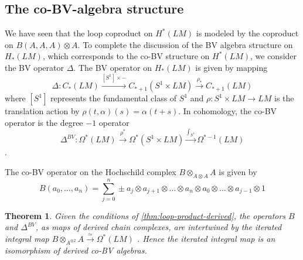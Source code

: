 \documentclass{scrartcl}
\theoremstyle{plain}
\newtheorem{theorem}{Theorem}[section]
\newtheorem{proposition}[theorem]{Proposition}
\theoremstyle{definition}
\newcommand{\quiso}{\simeq}
\let\xto\xrightarrow
\let\xfrom\xleftarrow
\newcommand{\blank}{-}
\begin{document}


\subsection{The co-BV-algebra structure} \label{subsec:co-bv-alg}
We have seen that the loop coproduct on $H^*(LM)$ is modeled by the coproduct on $B(A, A, A)\otimes A$. To complete the discussion of the BV algebra structure on $H_*(LM)$, which corresponds to the co-BV structure on $H^*(LM)$, we consider the BV operator $\Delta$. The BV operator on $H_*(LM)$ is given by mapping $$\Delta\colon C_*(LM)\xto{[S^1]\times\blank} C_{*+1}(S^1\times LM)\xto{\rho_*} C_{*+1}(LM)$$
where $[S^1]$ represents the fundamental class of $S^1$ and $\rho\colon S^1\times LM\to LM$ is the translation action by $\rho(t, \alpha)(s) = \alpha(t+s)$. In cohomology, the co-BV operator is the degree $-1$ operator $$\Delta^{BV}\colon \Omega^*(LM) \xto{\rho^*} \Omega^*(S^1\times LM) \xto{\int_{S^1}} \Omega^{*-1}(LM)$$.

The co-BV operator on the Hochschild complex $B\otimes_{A\otimes A} A$ is given by $$B(a_0, \dots, a_n) = \sum_{j=0}^n \pm a_j\otimes  a_{j+1}\otimes  \dots\otimes  a_n\otimes  a_0\otimes  \dots \otimes a_{j-1} \otimes 1$$

\begin{theorem}\label{thm:bv-iso}
    Given the conditions of \cref{thm:loop-product-derived}, the operators $B$ and $\Delta^{BV}$, as maps of derived chain complexes, are intertwined by the iterated integral map $B\otimes_{A^{\otimes 2}} A \xto{\quiso}\Omega^*(LM)$ . Hence the iterated integral map is an isomorphism of derived co-BV algebras. 
\end{theorem}
\end{document}
